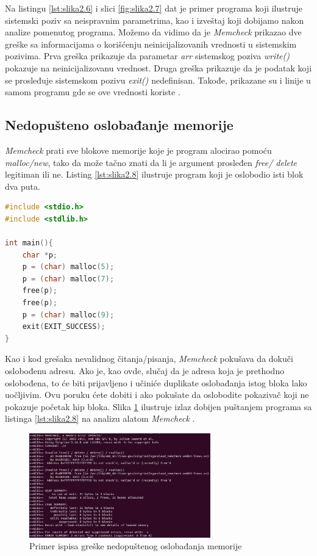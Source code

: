 \documentclass[12pt,oneside]{memoir}
\theoremstyle{plain}
\theoremstyle{definition}
\begin{document}
Na listingu \ref{lst:slika2.6} i slici \ref{fig:slika2.7} dat je primer programa koji ilustruje sistemski poziv sa neispravnim parametrima, kao i izveštaj koji dobijamo nakon analize pomenutog programa. Možemo da vidimo da je \textit{Memcheck} prikazao dve greške sa informacijama o korišćenju neinicijalizovanih vrednosti u sistemskim pozivima. Prva greška prikazuje da parametar \textit{arr} sistemskog poziva \textit{write()} pokazuje na neinicijalizovanu vrednost. Druga greška prikazuje da je podatak koji se prosleđuje sistemskom pozivu \textit{exit()} nedefinisan. Takođe, prikazane su i linije u samom programu gde se ove vrednosti koriste \cite{Memcheck}. 

\subsection{Nedopušteno oslobađanje memorije}
\textit{Memcheck} prati sve blokove memorije koje je program alocirao pomoću \textit{malloc/new}, tako da može tačno znati da li je argument prosleđen \textit{free/ delete} legitiman ili ne. Listing \ref{lst:slika2.8} ilustruje program koji je oslobodio isti blok dva puta. 

\begin{lstlisting}[caption={Program koji oslobađa isti blok dva puta}, label={lst:slika2.8},language={C}] 
#include <stdio.h>
#include <stdlib.h>

int main(){
	char *p;
	p = (char) malloc(5);
	p = (char) malloc(7);
	free(p);
	free(p);
	p = (char) malloc(9);
	exit(EXIT_SUCCESS);
}
\end{lstlisting}


Kao i kod grešaka nevalidnog čitanja/pisanja, \textit{Memcheck} pokušava da dokuči oslobođenu adresu. Ako je, kao ovde, slučaj da je adresa koja je prethodno oslobođena, to će biti prijavljeno i učiniće duplikate oslobađanja istog bloka lako uočljivim. Ovu poruku ćete dobiti i ako pokušate da oslobodite pokazivač koji ne pokazuje početak hip bloka. Slika \ref{fig:slika2.9} ilustruje izlaz dobijen puštanjem programa sa listinga \ref{lst:slika2.8} na analizu alatom \textit{Memcheck} \cite{Memcheck}. 

\begin{figure}[!ht]
  \centering
  \includegraphics[width=0.7\textwidth]{invalidFreeError.png}
  \caption{Primer ispisa greške nedopuštenog oslobađanja memorije}
  \label{fig:slika2.9}
\end{figure}
\end{document}
